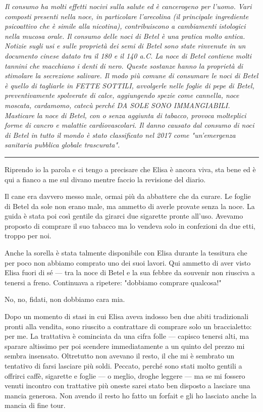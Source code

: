 \textit{Il consumo ha molti effetti nocivi sulla salute ed è cancerogeno per l'uomo. Vari composti presenti nella noce, in particolare l'arecolina (il principale ingrediente psicoattivo che è simile alla nicotina), contribuiscono a cambiamenti istologici nella mucosa orale. Il consumo delle noci di Betel è una pratica molto antica. Notizie sugli usi e sulle proprietà dei semi di Betel sono state rinvenute in un documento cinese datato tra il 180 e il 140 a.C. La noce di Betel contiene molti tannini che macchiano i denti di nero. Queste sostanze hanno la proprietà di stimolare la secrezione salivare. Il modo più comune di consumare le noci di Betel è quello di tagliarle in FETTE SOTTILI, avvolgerle nelle foglie di pepe di Betel, preventivamente spolverate di calce, aggiungendo spezie come cannella, noce moscata, cardamomo, catecù perché DA SOLE SONO IMMANGIABILI. Masticare la noce di Betel, con o senza aggiunta di tabacco, provoca molteplici forme di cancro e malattie cardiovascolari. Il danno causato dal consumo di noci di Betel in tutto il mondo è stato classificato nel 2017 come "un'emergenza sanitaria pubblica globale trascurata".}

\begin{center}
    \noindent\rule{0.6\textwidth}{0.4pt}
\end{center}

Riprendo io la parola e ci tengo a precisare che Elisa è ancora viva, sta bene ed è qui a fianco a me sul divano mentre faccio la revisione del diario.

Il cane era davvero messo male, ormai più da abbattere che da curare. Le foglie di Betel da sole non erano male, ma ammetto di averle provate senza la noce. La guida è stata poi così gentile da girarci due sigarette pronte all'uso. Avevamo proposto di comprare il suo tabacco ma lo vendeva solo in confezioni da due etti, troppo per noi.

Anche la sorella è stata talmente disponibile con Elisa durante la tessitura che per poco non abbiamo comprato uno dei suoi lavori. Qui ammetto di aver visto Elisa fuori di sé — tra la noce di Betel e la sua febbre da souvenir non riusciva a tenersi a freno. Continuava a ripetere: "dobbiamo comprare qualcosa!"

No, no, fidati, non dobbiamo cara mia.

Dopo un momento di stasi in cui Elisa aveva indosso ben due abiti tradizionali pronti alla vendita, sono riuscito a contrattare di comprare solo un braccialetto: per me. La trattativa è cominciata da una cifra folle — capisco tenersi alti, ma sparare altissimo per poi scendere immediatamente a un quinto del prezzo mi sembra insensato. Oltretutto non avevano il resto, il che mi è sembrato un tentativo di farsi lasciare più soldi. Peccato, perché sono stati molto gentili a offrirci caffè, sigarette e foglie — o meglio, droghe leggere — ma se mi fossero venuti incontro con trattative più oneste sarei stato ben disposto a lasciare una mancia generosa. Non avendo il resto ho fatto un forfait e gli ho lasciato anche la mancia di fine tour.

